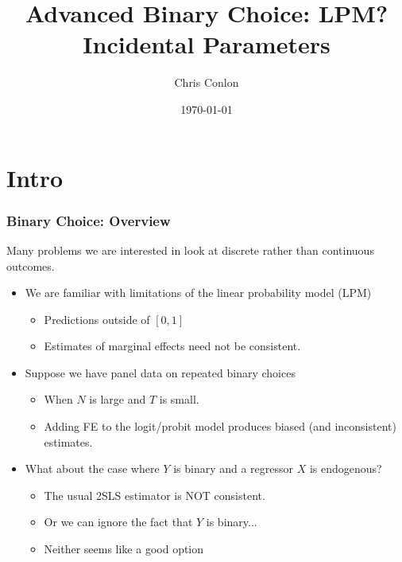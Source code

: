 \documentclass[xcolor=pdftex,dvipsnames,table,mathserif,aspectratio=169]{beamer}
\begin{document}
\title{Advanced Binary Choice: LPM? Incidental Parameters}
\author{Chris Conlon}
\date{\today}

\frame{\titlepage}

\section{Intro}

\begin{frame}
\frametitle{Binary Choice: Overview}
Many problems we are interested in look at discrete rather than continuous outcomes.
\begin{itemize}
\item We are familiar with limitations of the linear probability model (LPM)
\begin{itemize}
\item Predictions outside of $[0,1]$
\item Estimates of marginal effects need not be consistent.
\end{itemize}
\item Suppose we have panel data on repeated binary choices
\begin{itemize}
\item When $N$ is large and $T$ is small.
\item Adding FE to the logit/probit model produces biased (and inconsistent) estimates.
\end{itemize}
\item What about the case where $Y$ is binary and a regressor $X$ is endogenous?
\begin{itemize}
\item The usual 2SLS estimator is \alert{NOT consistent}.
\item Or we can ignore the fact that $Y$ is binary...
\item Neither seems like a good option
\end{itemize}
\end{itemize}
\end{frame}
\end{document}
